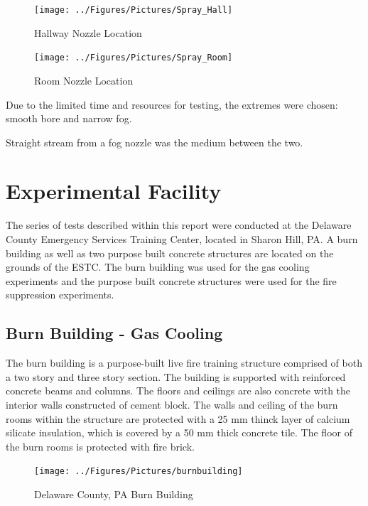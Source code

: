 \documentclass[12pt,oneside]{book}
\begin{document}
\begin{figure}[!ht]
	\texttt{[image: ../Figures/Pictures/Spray\_Hall]}
	\caption{Hallway Nozzle Location}
	\label{fig:Hallway_Nozzle_Location}
\end{figure}

\begin{figure}[!ht]
	\texttt{[image: ../Figures/Pictures/Spray\_Room]}
	\caption{Room Nozzle Location}
	\label{fig:Room_Nozzle_Location}
\end{figure}

Due to the limited time and resources for testing, the extremes were chosen: smooth bore and narrow fog.

Straight stream from a fog nozzle was the medium between the two.

\section{Experimental Facility}
\label{sec:Experimental_Facility}

The series of tests described within this report were conducted at the Delaware County Emergency Services Training Center, located in Sharon Hill, PA. A burn building as well as two purpose built concrete structures are located on the grounds of the ESTC. The burn building was used for the gas cooling experiments and the purpose built concrete structures were used for the fire suppression experiments.   

\subsection{Burn Building - Gas Cooling}
\label{sec:Burn_Building}

The burn building is a purpose-built live fire training structure comprised of both a two story and three story section. The building is supported with reinforced concrete beams and columns.  The floors and ceilings are also concrete with the interior walls constructed of cement block. The walls and ceiling of the burn rooms within the structure are protected with a 25 mm thinck layer of calcium silicate insulation, which is covered by a 50 mm thick concrete tile. The floor of the burn rooms is protected with fire brick.

\begin{figure}[!ht]
	\texttt{[image: ../Figures/Pictures/burnbuilding]}
	\caption{Delaware County, PA Burn Building}
	\label{fig:Delaware_County,_PA_Burn_Building}
\end{figure}
\end{document}
